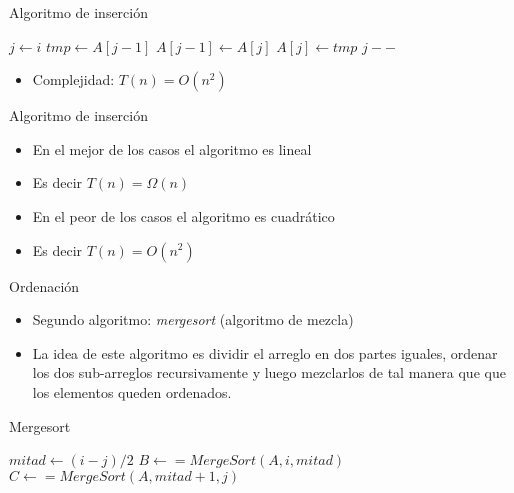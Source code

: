 \documentclass[]{beamer}
\begin{document}
\begin{frame}{Algoritmo de inserci\'on}
  \begin{algorithm}[H]
    \BlankLine
    {
      $j \leftarrow i$ \;
      {
        $tmp \leftarrow A[j-1]$ \;
        $A[j-1] \leftarrow A[j]$ \;
        $A[j] \leftarrow tmp$ \;
        $j--$
      }
    }
  \end{algorithm}
  \pause
  \begin{itemize}
    \item Complejidad: \pause $T(n)=O(n^2)$
  \end{itemize}
\end{frame}

\begin{frame}{Algoritmo de inserci\'on}
  \begin{itemize}
    \item En el mejor de los casos el algoritmo es lineal
    \item Es decir $T(n)= \Omega(n)$ 
    \item En el peor de los casos el algoritmo es cuadr\'atico
    \item Es decir $T(n)= O(n^2)$
  \end{itemize}
\end{frame}


\begin{frame}{Ordenaci\'on}
  \begin{itemize}
    \item Segundo algoritmo: \textit{mergesort} (algoritmo de mezcla)
      \pause
    \item La idea de este algoritmo es dividir el arreglo en dos partes iguales,
      ordenar los dos sub-arreglos recursivamente y luego mezclarlos de tal
      manera que que los elementos queden ordenados.
  \end{itemize}
\end{frame}

\begin{frame}{Mergesort}
  \begin{algorithm}[H]
    \BlankLine
    {
      \KwRet{}
    }
    $mitad \leftarrow (i-j)/2$ \;
    $B \leftarrow = MergeSort(A, i, mitad)$ \;
    $C \leftarrow = MergeSort(A, mitad+1, j)$ \;
  \end{algorithm}
\end{frame}
\end{document}
